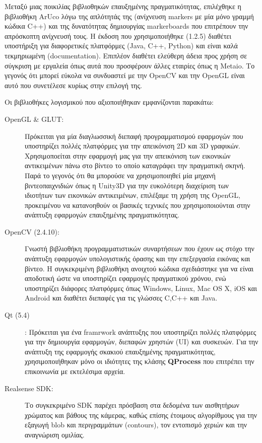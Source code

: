 Μεταξύ μιας ποικιλίας βιβλιοθηκών επαυξημένης πραγματικότητας, επιλέχθηκε η βιβλιοθήκη ArUco λόγω της απλότητάς της (ανίχνευση markers με μία μόνο γραμμή κώδικα C++) και της δυνατότητας δημιουργίας markerboards που επιτρέπουν την απρόσκοπτη ανίχνευσή τους. Η έκδοση που χρησιμοποιήθηκε (1.2.5) διαθέτει υποστήριξη για διαφορετικές πλατφόρμες (Java, C++, Python) και είναι καλά τεκμηριωμένη (documentation). Επιπλέον διαθέτει ελεύθερη άδεια προς χρήση σε σύγκριση με εργαλεία όπως αυτά που προσφέρουν άλλες εταιρίες όπως η Metaio. Το γεγονός ότι μπορεί εύκολα να συνδυαστεί με την OpenCV και την OpenGL είναι αυτό που συνετέλεσε κυρίως στην επιλογή της.


Οι βιβλιοθήκες λογισμικού που αξιοποιήθηκαν εμφανίζονται παρακάτω:

\begin{description}


\item[OpenGL \& GLUT:] Πρόκειται για μία διαγλωσσική διεπαφή προγραμματισμού εφαρμογών που υποστηρίζει πολλές πλατφόρμες για την απεικόνιση 2D και 3D γραφικών. Χρησιμοποείται στην εφαρμογή μας για την απεικόνιση των εικονικών αντικειμένων πάνω στο βίντεο το οποίο καταγράφει την πραγματική σκηνή. Παρά το γεγονός ότι θα μπορούσε να χρησιμοποιηθεί μία μηχανή βιντεοπαιχνιδιών όπως η Unity3D για την ευκολότερη διαχείριση των ιδιοτήτων των εικονικών αντικειμένων, επιλέξαμε τη χρήση της OpenGL, προκειμένου να κατανοηθούν οι βασικές τεχνικές που χρησιμοποιούνται στην ανάπτυξη εφαρμογών επαυξημένης πραγματικότητας.



\item[OpenCV (2.4.10):] Γνωστή βιβλιοθήκη προγραμματιστικών συναρτήσεων που έχουν ως στόχο την ανάπτυξη εφαρμογών υπολογιστικής όρασης και την επεξεργασία εικόνας και βίντεο. Η συγκεκριμένη βιβλιοθήκη ανοιχτού κώδικα σχεδιάστηκε για να είναι αποδοτική ώστε να υποστηρίζει εφαρμογές πραγματικού χρόνου, ενώ υποστηρίζει διάφορες πλατφόρμες όπως Windows, Linux, Mac OS X, iOS και Android και διαθέτει διεπαφές για τις γλώσσες C,C++ και Java. 


\item[Qt (5.4)]: Πρόκειται για ένα framrwork ανάπτυξης που υποστηρίζει πολλές πλατφόρμες για την δημιουργία εφαρμογών, διεπαφών χρηστών (UI) και συσκευών. Για την ανάπτυξη της εφαρμογής σκακιού επαυξημένης πραγματικότητας, χρησιμοποιήθηκαν μόνο οι ιδιότητες της κλάσης \textbf{QProcess} που επιτρέπει την επικοινωνία με εκτελέσιμα αρχεία.


\item[Realsense SDK:] Το συγκεκριμένο SDK παρέχει πρόσβαση στα δεδομένα των αισθητήρων χρώματος και βάθους της κάμερας, καθώς επίσης έτοιμους αλγορίθμους για την εξαγωγή blob και περιγραμμάτων (contours), τον εντοπισμό χεριών και την αναγνώριση ομιλίας. 



\end{description}



